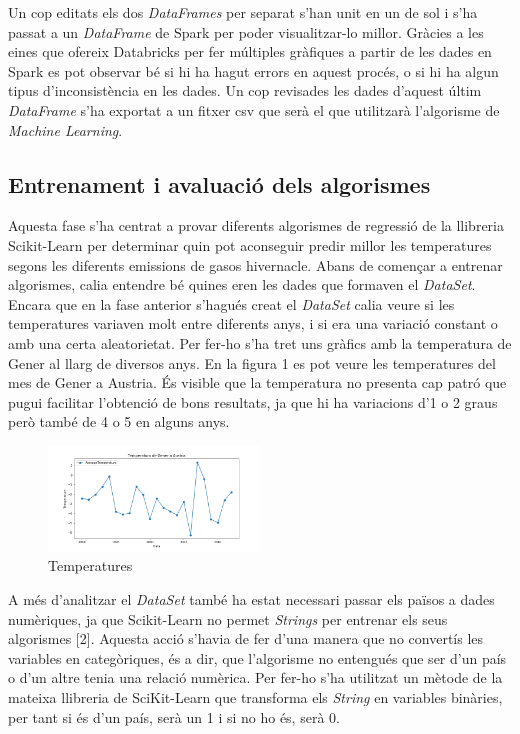 \documentclass[10pt,a4paper,twocolumn,twoside]{article}
\begin{document}
Un cop editats els dos \textit{DataFrames} per separat s'han unit en un de sol i s'ha passat a un \textit{DataFrame} de Spark per poder visualitzar-lo millor. Gràcies a les eines que ofereix Databricks per fer múltiples gràfiques a partir de les dades en Spark es pot observar bé si hi ha hagut errors en aquest procés, o si hi ha algun tipus d'inconsistència en les dades. Un cop revisades les dades d'aquest últim \textit{DataFrame} s'ha exportat a un fitxer csv que serà el que utilitzarà l'algorisme de \textit{Machine Learning}.
\subsection{Entrenament i avaluació dels algorismes}
Aquesta fase s'ha centrat a provar diferents algorismes de regressió de la llibreria Scikit-Learn per determinar quin pot aconseguir predir millor les temperatures segons les diferents emissions de gasos hivernacle. Abans de començar a entrenar algorismes, calia entendre bé quines eren les dades que formaven el \textit{DataSet}. Encara que en la fase anterior s'hagués creat el \textit{DataSet} calia veure si les temperatures variaven molt entre diferents anys, i si era una variació constant o amb una certa aleatorietat. Per fer-ho s'ha tret uns gràfics amb la temperatura de Gener al llarg de diversos anys. En la figura 1 es pot veure les temperatures del mes de Gener a Austria. És visible que la temperatura no presenta cap patró que pugui facilitar l'obtenció de bons resultats, ja que hi ha variacions d'1 o 2 graus però també de 4 o 5 en alguns anys.
\begin{figure}[!h]
\centering
	\includegraphics[width=0.5\textwidth]{../img/tempAustria}
	\caption{Temperatures }
	\label{fig-tempAustria}
\end{figure}
A més d'analitzar el \textit{DataSet} també ha estat necessari passar els països a dades numèriques, ja que Scikit-Learn no permet \textit{Strings} per entrenar els seus algorismes [2]. Aquesta acció s'havia de fer d'una manera que no convertís les variables en categòriques, és a dir, que l'algorisme no entengués que ser d'un país o d'un altre tenia una relació numèrica. Per fer-ho s'ha utilitzat un mètode de la mateixa llibreria de SciKit-Learn que transforma els \textit{String} en variables binàries, per tant si és d'un país, serà un 1 i si no ho és, serà 0.
\end{document}

